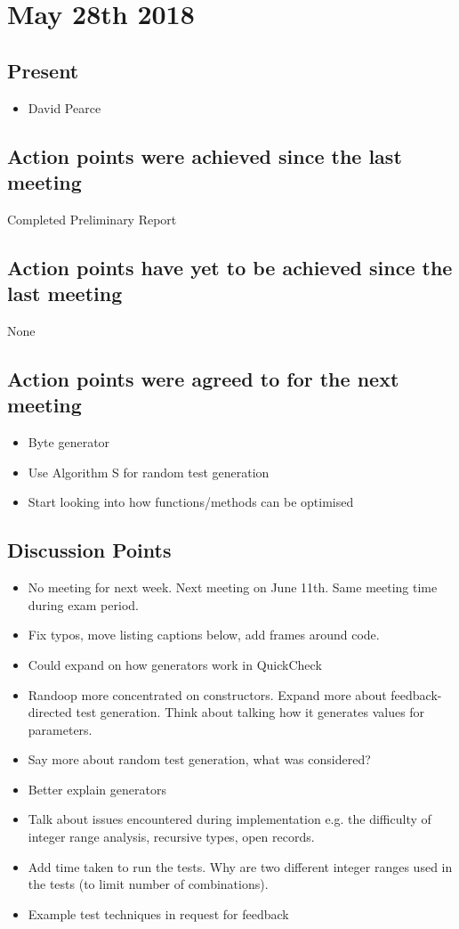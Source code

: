 \documentclass[]{article}
\begin{document}
\section{May 28th 2018}
\subsection{Present}
\begin{itemize}
    \item David Pearce
\end{itemize}

\subsection{Action points were achieved since the last meeting}
Completed Preliminary Report
\subsection{Action points have yet to be achieved since the last meeting}
None
\subsection{Action points were agreed to for the next meeting}
\begin{itemize}
	\item Byte generator
	\item Use Algorithm S for random test generation
	\item Start looking into how functions/methods can be optimised
\end{itemize}
\subsection{Discussion Points}
\begin{itemize}
 \item No meeting for next week. Next meeting on June 11th. Same meeting time during exam period. 
 \item Fix typos, move listing captions below, add frames around code.
 \item Could expand on how generators work in QuickCheck
 \item Randoop more concentrated on constructors. Expand more about feedback-directed test generation. Think about talking how it generates values for parameters.
 \item Say more about random test generation, what was considered?
 \item Better explain generators
 \item Talk about issues encountered during implementation e.g. the difficulty of integer range analysis, recursive types, open records.
 \item Add time taken to run the tests. Why are two different integer ranges used in the tests (to limit number of combinations).
 \item Example test techniques in request for feedback
\end{itemize}
\end{document}
